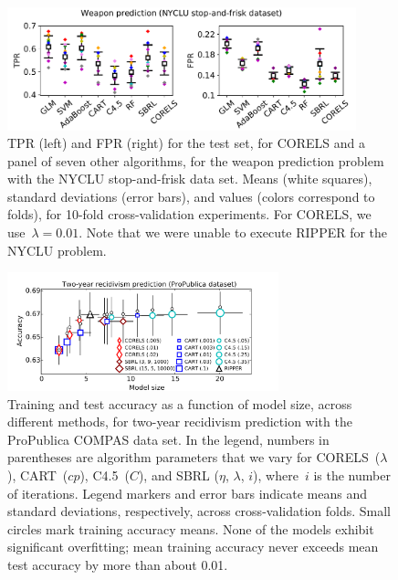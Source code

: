 \documentclass[twoside,11pt]{article}
\def\Reg{{\lambda}}
\begin{document}
\begin{figure}[t!]
\begin{center}
\includegraphics[trim={2mm, 10mm, 2mm, 0mm},
width=0.9\textwidth]{figs/compare-weapon.pdf}
\end{center}
\caption{TPR (left) and FPR (right) for the test set,
for CORELS and a panel of seven other algorithms,
for the weapon prediction problem with the NYCLU stop-and-frisk data set.
%
Means (white squares),
standard deviations (error bars),
and values (colors correspond to folds),
for 10-fold cross-validation experiments.
%
For CORELS, we use~${\Reg=0.01}$.
%
Note that we were unable to execute RIPPER for the NYCLU problem.
}
\label{fig:weapon-comparison}
\end{figure}
%
\begin{figure}[t!]
\begin{center}
\includegraphics[trim={12mm, 5mm, 24mm, 5mm},
width=0.7\textwidth]{figs/compas-sparsity-training.pdf}
%
\end{center}
\caption{Training and test accuracy as a function of model size, across different methods,
for two-year recidivism prediction with the ProPublica COMPAS data set.
%
In the legend, numbers in parentheses are algorithm parameters that we vary
for CORELS~($\Reg$), CART~($cp$), C4.5~($C$), and SBRL ($\eta$, $\lambda$, $i$),
where~$i$ is the number of iterations.
%
Legend markers and error bars indicate means and standard deviations,
respectively, across cross-validation folds.
%
Small circles mark training accuracy means.
%
None of the models exhibit significant overfitting;
mean training accuracy never exceeds mean test accuracy
by more than about 0.01.
}
\label{fig:sparsity-compas}
\end{figure}
\end{document}
